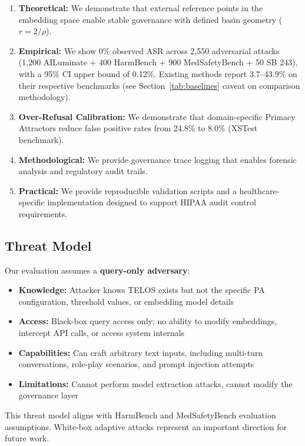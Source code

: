 \documentclass[11pt,twocolumn]{article}
\begin{document}
\begin{enumerate}
    \item \textbf{Theoretical:} We demonstrate that external reference points in the embedding space enable stable governance with defined basin geometry ($r = 2/\rho$).
    \item \textbf{Empirical:} We show 0\% observed ASR across 2,550 adversarial attacks (1,200 AILuminate + 400 HarmBench + 900 MedSafetyBench + 50 SB 243), with a 95\% CI upper bound of 0.12\%. Existing methods report 3.7--43.9\% on their respective benchmarks (see Section~\ref{tab:baselines} caveat on comparison methodology).
    \item \textbf{Over-Refusal Calibration:} We demonstrate that domain-specific Primacy Attractors reduce false positive rates from 24.8\% to 8.0\% (XSTest benchmark).
    \item \textbf{Methodological:} We provide governance trace logging that enables forensic analysis and regulatory audit trails.
    \item \textbf{Practical:} We provide reproducible validation scripts and a healthcare-specific implementation designed to support HIPAA audit control requirements.
\end{enumerate}

\subsection{Threat Model}

Our evaluation assumes a \textbf{query-only adversary}:

\begin{itemize}
    \item \textbf{Knowledge:} Attacker knows TELOS exists but not the specific PA configuration, threshold values, or embedding model details
    \item \textbf{Access:} Black-box query access only; no ability to modify embeddings, intercept API calls, or access system internals
    \item \textbf{Capabilities:} Can craft arbitrary text inputs, including multi-turn conversations, role-play scenarios, and prompt injection attempts
    \item \textbf{Limitations:} Cannot perform model extraction attacks, cannot modify the governance layer
\end{itemize}

This threat model aligns with HarmBench and MedSafetyBench evaluation assumptions. White-box adaptive attacks represent an important direction for future work.
\end{document}
